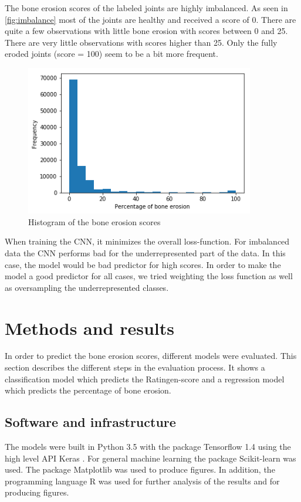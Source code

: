 \documentclass[12pt]{article}
\begin{document}
The bone erosion scores of the labeled joints are highly imbalanced. As seen in \autoref{fig:imbalance} most of the joints are healthy and received a score of 0. There are quite a few observations with little bone erosion with scores between 0 and 25. There are very little observations with scores higher than 25. Only the fully eroded joints (score = 100) seem to be a bit more frequent.

\begin{figure}[ht]
\includegraphics[width=10cm]{imbalance}	
\caption{Histogram of the bone erosion scores}
\label{fig:imbalance}
\end{figure}

When training the CNN, it minimizes the overall loss-function. For imbalanced data the CNN performs bad for the underrepresented part of the data. In this case, the model would be bad predictor for high scores. In order to make the model a good predictor for all cases, we tried weighting the loss function as well as oversampling the underrepresented classes.



\newpage
\section{Methods and results}
\label{sec:methods&results}

In order to predict the bone erosion scores, different models were evaluated. This section describes the different steps in the evaluation process. It shows a classification model which predicts the Ratingen-score and a regression model which predicts the percentage of bone erosion.

\subsection{Software and infrastructure}
The models were built in Python 3.5 \cite{python} with the package Tensorflow 1.4 \cite{tensorflow} using the high level API Keras \cite{keras}. For general machine learning the package Scikit-learn \cite{scikit-learn} was used. The package Matplotlib \cite{matplotlib} was used to produce figures. In addition, the programming language R \cite{r} was used for further analysis of the results and for producing figures.
\end{document}
